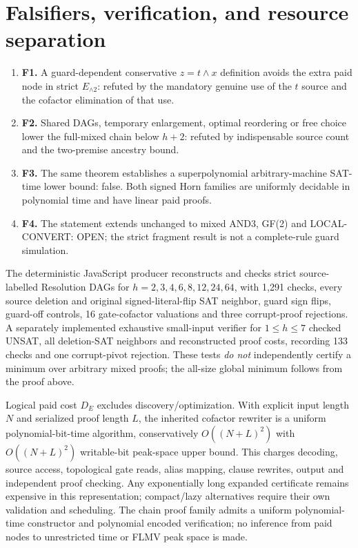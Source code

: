 \documentclass[11pt]{article}
\begin{document}
\section*{Falsifiers, verification, and resource separation}
\begin{enumerate}
\item[] \textbf{F1.} A guard-dependent conservative \(z=t\land x\) definition avoids the extra paid node in strict \(E_{\land2}\): refuted by the mandatory genuine use of the \(t\) source and the cofactor elimination of that use.
\item[] \textbf{F2.} Shared DAGs, temporary enlargement, optimal reordering or free choice lower the full-mixed chain below \(h+2\): refuted by indispensable source count and the two-premise ancestry bound.
\item[] \textbf{F3.} The same theorem establishes a superpolynomial arbitrary-machine SAT-time lower bound: false. Both signed Horn families are uniformly decidable in polynomial time and have linear paid proofs.
\item[] \textbf{F4.} The statement extends unchanged to mixed AND3, GF(2) and LOCAL-CONVERT: OPEN; the strict fragment result is not a complete-rule guard simulation.
\end{enumerate}
The deterministic JavaScript producer reconstructs and checks strict source-labelled Resolution DAGs for \(h=2,3,4,6,8,12,24,64\), with 1,291 checks, every source deletion and original signed-literal-flip SAT neighbor, guard sign flips, guard-off controls, 16 gate-cofactor valuations and three corrupt-proof rejections. A separately implemented exhaustive small-input verifier for \(1\le h\le7\) checked UNSAT, all deletion-SAT neighbors and reconstructed proof costs, recording 133 checks and one corrupt-pivot rejection. These tests \emph{do not} independently certify a minimum over arbitrary mixed proofs; the all-size global minimum follows from the proof above.

Logical paid cost \(D_E\) excludes discovery/optimization. With explicit input length \(N\) and serialized proof length \(L\), the inherited cofactor rewriter is a uniform polynomial-bit-time algorithm, conservatively \(O((N+L)^2)\) with \(O((N+L)^2)\) writable-bit peak-space upper bound. This charges decoding, source access, topological gate reads, alias mapping, clause rewrites, output and independent proof checking. Any exponentially long expanded certificate remains expensive in this representation; compact/lazy alternatives require their own validation and scheduling. The chain proof family admits a uniform polynomial-time constructor and polynomial encoded verification; no inference from paid nodes to unrestricted time or FLMV peak space is made.
\end{document}
